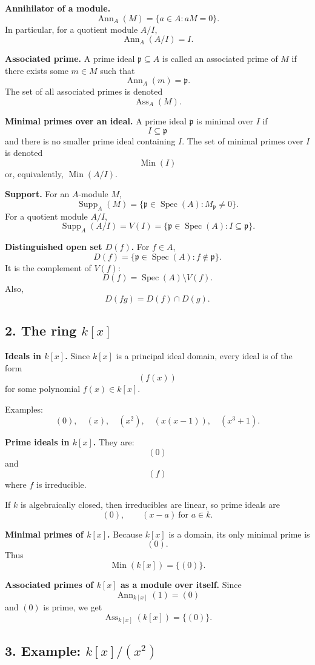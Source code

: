 \documentclass[12pt,a4paper]{article}
\theoremstyle{notespace}
\DeclareMathOperator{\Spec}{Spec}
\DeclareMathOperator{\Ass}{Ass}
\DeclareMathOperator{\Ann}{Ann}
\DeclareMathOperator{\Supp}{Supp}
\DeclareMathOperator{\Min}{Min}
\begin{document}
\textbf{Annihilator of a module.}
\[
\Ann_A(M)=\{a\in A:aM=0\}.
\]
In particular, for a quotient module \(A/I\),
\[
\Ann_A(A/I)=I.
\]

\textbf{Associated prime.}
A prime ideal \(\mathfrak p\subseteq A\) is called an associated prime of \(M\) if there exists some \(m\in M\) such that
\[
\Ann_A(m)=\mathfrak p.
\]
The set of all associated primes is denoted
\[
\Ass_A(M).
\]

\textbf{Minimal primes over an ideal.}
A prime ideal \(\mathfrak p\) is minimal over \(I\) if
\[
I\subseteq \mathfrak p
\]
and there is no smaller prime ideal containing \(I\).
The set of minimal primes over \(I\) is denoted
\[
\Min(I)
\]
or, equivalently, \(\Min(A/I)\).

\textbf{Support.}
For an \(A\)-module \(M\),
\[
\Supp_A(M)=\{\mathfrak p\in \Spec(A):M_{\mathfrak p}\neq 0\}.
\]
For a quotient module \(A/I\),
\[
\Supp_A(A/I)=V(I)=\{\mathfrak p\in \Spec(A):I\subseteq \mathfrak p\}.
\]

\textbf{Distinguished open set \(D(f)\).}
For \(f\in A\),
\[
D(f)=\{\mathfrak p\in \Spec(A):f\notin \mathfrak p\}.
\]
It is the complement of \(V(f)\):
\[
D(f)=\Spec(A)\setminus V(f).
\]
Also,
\[
D(fg)=D(f)\cap D(g).
\]

\subsection{2. The ring \(k[x]\)}

\textbf{Ideals in \(k[x]\).}
Since \(k[x]\) is a principal ideal domain, every ideal is of the form
\[
(f(x))
\]
for some polynomial \(f(x)\in k[x]\).

Examples:
\[
(0),\quad (x),\quad (x^2),\quad (x(x-1)),\quad (x^3+1).
\]

\textbf{Prime ideals in \(k[x]\).}
They are:
\[
(0)
\]
and
\[
(f)
\]
where \(f\) is irreducible.

If \(k\) is algebraically closed, then irreducibles are linear, so prime ideals are
\[
(0),\qquad (x-a)\ \text{for } a\in k.
\]

\textbf{Minimal primes of \(k[x]\).}
Because \(k[x]\) is a domain, its only minimal prime is
\[
(0).
\]
Thus
\[
\Min(k[x])=\{(0)\}.
\]

\textbf{Associated primes of \(k[x]\) as a module over itself.}
Since
\[
\Ann_{k[x]}(1)=(0)
\]
and \((0)\) is prime, we get
\[
\Ass_{k[x]}(k[x])=\{(0)\}.
\]

\subsection{3. Example: \(k[x]/(x^2)\)}
\end{document}
